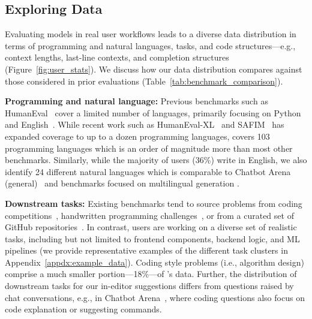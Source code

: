 \subsection{Exploring \systemName Data}\label{subsec:comparison}

Evaluating models in real user workflows leads to a diverse data distribution in terms of programming and natural languages, tasks, and code structures---e.g., context lengths, last-line contexts, and completion structures (Figure~\ref{fig:user_stats}).
We discuss how our data distribution compares against those considered in prior evaluations (Table~\ref{tab:benchmark_comparison}).


\textbf{Programming and natural language:}
Previous benchmarks such as HumanEval~\cite{chen2021evaluating} cover a limited number of languages, primarily focusing on Python and English~\cite{bavarian2022efficient, jain2024livecodebench, white2024livebench,  zhuo2024bigcodebenchbenchmarkingcodegeneration}.
While recent work such as HumanEval-XL~\cite{peng2024humaneval} and SAFIM~\cite{gong2024evaluation} has expanded coverage to up to a dozen programming languages,
\systemName covers 103 programming languages  which is an order of magnitude more than most other benchmarks.
Similarly, while the majority of \systemName users (36\%) write in English, we also identify 24 different natural languages which is comparable to Chatbot Arena (general)~\citep{chiang2024chatbot} and benchmarks focused on multilingual generation 
\citep{peng2024humaneval}. 


\textbf{Downstream tasks:} 
Existing benchmarks tend to source problems from coding competitions~\cite{jain2024livecodebench, white2024livebench}, handwritten programming challenges~\cite{chen2021evaluating}, or from a curated set of GitHub repositories~\cite{gong2024evaluation}.
In contrast, \systemName users are working on a diverse set of realistic tasks, including but not limited to frontend components, backend logic, and ML pipelines (we provide representative examples of the different task clusters in Appendix~\ref{appdx:example_data}).
Coding style problems (i.e., algorithm design) comprise a much smaller portion---18\%---of \systemName's data. 
Further, the distribution of downstream tasks for our in-editor suggestions differs from questions raised by chat conversations, e.g., in Chatbot Arena~\citep{chiang2024chatbot}, where coding questions also focus on code explanation or suggesting commands.


